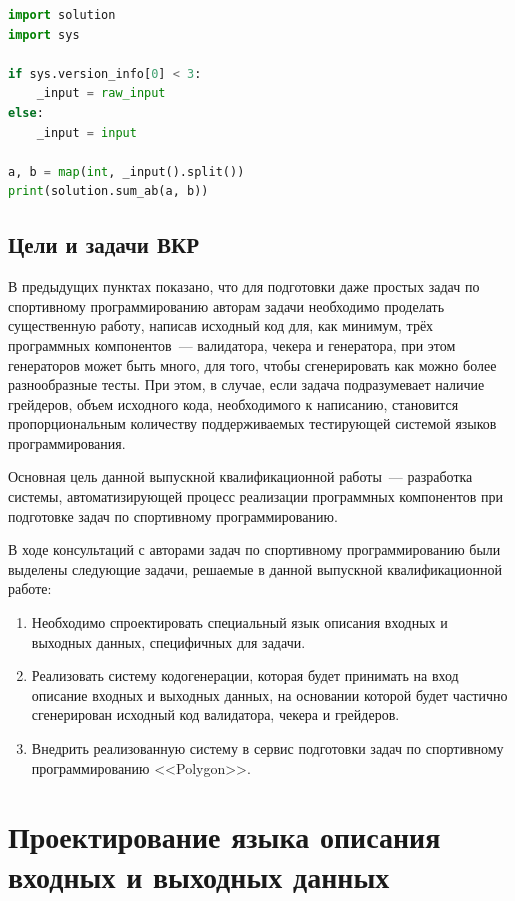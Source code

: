 \documentclass[times,specification,annotation]{style/itmo-student-thesis/itmo-student-thesis}
\begin{document}
\begin{lstlisting}[float=!h,caption={Пример грейдера для языка Python},label={a-plus-b-grader-py},language=python]
import solution
import sys

if sys.version_info[0] < 3:
    _input = raw_input
else:
    _input = input
 
a, b = map(int, _input().split())
print(solution.sum_ab(a, b))
\end{lstlisting}

\section{Цели и задачи ВКР}

В предыдущих пунктах показано, что для подготовки даже простых задач по спортивному программированию авторам задачи необходимо проделать существенную работу, написав исходный код для, как минимум, трёх программных компонентов~--- валидатора, чекера и генератора, при этом генераторов может быть много, для того, чтобы сгенерировать как можно более разнообразные тесты. При этом, в случае, если задача подразумевает наличие грейдеров, объем исходного кода, необходимого к написанию, становится пропорциональным количеству поддерживаемых тестирующей системой языков программирования.


Основная цель данной выпускной квалификационной работы~--- разработка системы, автоматизирующей процесс реализации программных компонентов при подготовке задач по спортивному программированию.

В ходе консультаций с авторами задач по спортивному программированию были выделены следующие задачи, решаемые в данной выпускной квалификационной работе:

\begin{enumerate}
    \item Необходимо спроектировать специальный язык описания входных и выходных данных, специфичных для задачи.
    \item Реализовать систему кодогенерации, которая будет принимать на вход описание входных и выходных данных, на основании которой будет частично сгенерирован исходный код валидатора, чекера и грейдеров.
    \item Внедрить реализованную систему в сервис подготовки задач по спортивному программированию <<Polygon>>.
\end{enumerate}

\chapter{Проектирование языка описания входных и выходных данных}
\end{document}
